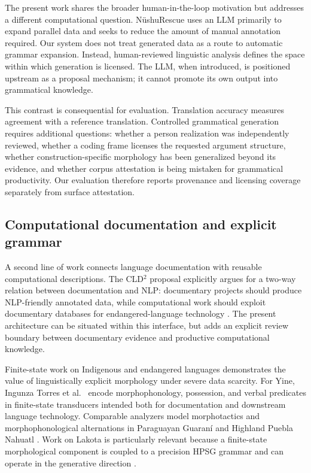 \documentclass[11pt]{article}
\begin{document}
The present work shares the broader human-in-the-loop motivation but addresses
a different computational question. NüshuRescue uses an LLM primarily to expand parallel data
and seeks to reduce the amount of manual annotation required. Our system does
not treat generated data as a route to automatic grammar expansion. Instead,
human-reviewed linguistic analysis defines the space within which generation is
licensed. The LLM, when introduced, is positioned upstream as a proposal
mechanism; it cannot promote its own output into grammatical knowledge.

This contrast is consequential for evaluation. Translation accuracy measures
agreement with a reference translation. Controlled grammatical generation
requires additional questions: whether a person realization was independently
reviewed, whether a coding frame licenses the requested argument structure,
whether construction-specific morphology has been generalized beyond its
evidence, and whether corpus attestation is being mistaken for grammatical
productivity. Our evaluation therefore reports provenance and licensing
coverage separately from surface attestation.

\subsection{Computational documentation and explicit grammar}

A second line of work connects language documentation with reusable
computational descriptions. The CLD$^2$ proposal explicitly argues for a
two-way relation between documentation and NLP: documentary projects should
produce NLP-friendly annotated data, while computational work should exploit
documentary databases for endangered-language technology
\cite{zariquiey2022cld2}. The present architecture can be situated within this
interface, but adds an explicit review boundary between documentary evidence
and productive computational knowledge.

Finite-state work on Indigenous and endangered languages demonstrates the
value of linguistically explicit morphology under severe data scarcity. For
Yine, Ingunza Torres et al.~\cite{ingunza2021yine} encode morphophonology,
possession, and verbal predicates in finite-state transducers intended both for
documentation and downstream language technology. Comparable analyzers model
morphotactics and morphophonological alternations in Paraguayan Guaraní
\cite{kuznetsova2021guarani} and Highland Puebla Nahuatl
\cite{pugh2023nahuatl}. Work on Lakota is particularly relevant because a
finite-state morphological component is coupled to a precision HPSG grammar
and can operate in the generative direction \cite{curtis2014lakota}.
\end{document}
